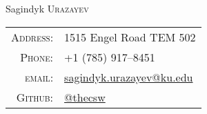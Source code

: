 \documentclass[a4paper,10pt]{article}
\begin{document}
\pagestyle{empty} %

\par{\centering
		{\Huge Sagindyk \textsc{Urazayev}
	}\bigskip\par}

      \begin{center}
        \begin{tabular}{rl}
          \textsc{Address:}   & 1515 Engel Road TEM 502 \\
          \textsc{Phone:}     & +1 (785) 917--8451\\
          \textsc{email:}     & \href{mailto:sagindyk.urazayev@ku.edu}{sagindyk.urazayev@ku.edu}\\
          \textsc{Github:} & \href{https://github.com/thecsw}{@thecsw}\\
        \end{tabular}
      \end{center}

\end{document}
